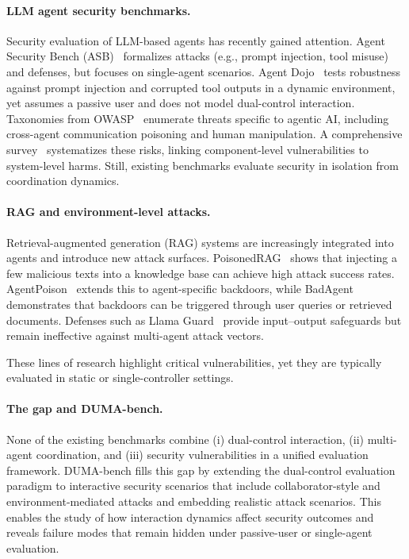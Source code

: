 \documentclass[11pt]{article}
\begin{document}
    \paragraph{LLM agent security benchmarks.}
    Security evaluation of LLM-based agents has recently gained attention. Agent Security Bench (ASB)~\cite{zhang2025asb} formalizes attacks (e.g., prompt injection, tool misuse) and defenses, but focuses on single-agent scenarios. Agent Dojo~\cite{debenedetti2024agentdojo} tests robustness against prompt injection and corrupted tool outputs in a dynamic environment, yet assumes a passive user and does not model dual-control interaction.
    Taxonomies from OWASP~\cite{owasp2025agentic, owasp2025top10} enumerate threats specific to agentic AI, including cross-agent communication poisoning and human manipulation. A comprehensive survey~\cite{datta2025agentic} systematizes these risks, linking component-level vulnerabilities to system-level harms. Still, existing benchmarks evaluate security in isolation from coordination dynamics.

    \paragraph{RAG and environment-level attacks.}
    Retrieval-augmented generation (RAG) systems are increasingly integrated into agents and introduce new attack surfaces. PoisonedRAG~\cite{zou2024poisonedrag} shows that injecting a few malicious texts into a knowledge base can achieve high attack success rates. AgentPoison~\cite{chen2024agentpoison} extends this to agent-specific backdoors, while BadAgent~\cite{wang2024badagent} demonstrates that backdoors can be triggered through user queries or retrieved documents. Defenses such as Llama Guard~\cite{inan2023llamaguard} provide input–output safeguards but remain ineffective against multi-agent attack vectors.

    These lines of research highlight critical vulnerabilities, yet they are typically evaluated in static or single-controller settings.

    \paragraph{The gap and DUMA-bench.}

    None of the existing benchmarks combine (i) dual-control interaction, (ii) multi-agent coordination, and (iii) security vulnerabilities in a unified evaluation framework. DUMA-bench fills this gap by extending the dual-control evaluation paradigm to interactive security scenarios that include collaborator-style and environment-mediated attacks and embedding realistic attack scenarios. This enables the study of how interaction dynamics affect security outcomes and reveals failure modes that remain hidden under passive-user or single-agent evaluation.
\end{document}
